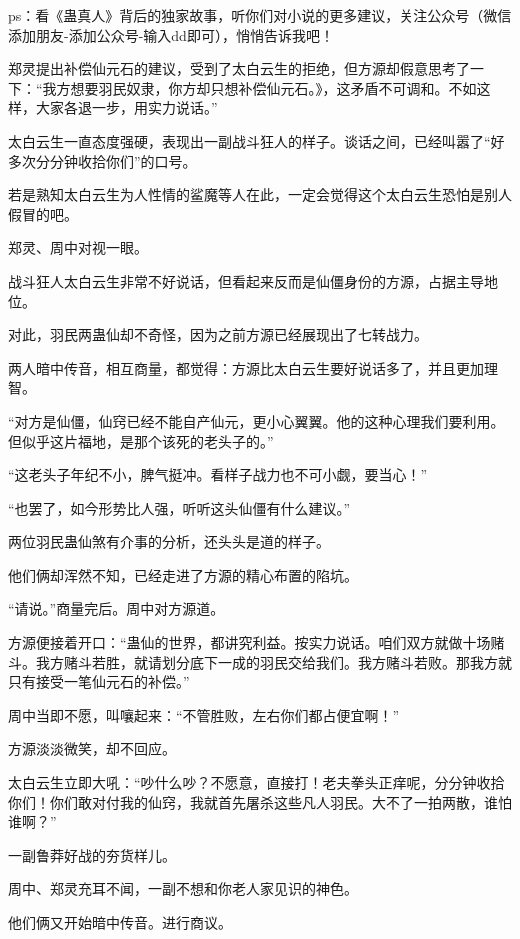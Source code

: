 
\begin{this_body}

ps：看《蛊真人》背后的独家故事，听你们对小说的更多建议，关注公众号（微信添加朋友-添加公众号-输入dd即可），悄悄告诉我吧！

郑灵提出补偿仙元石的建议，受到了太白云生的拒绝，但方源却假意思考了一下：“我方想要羽民奴隶，你方却只想补偿仙元石。》，这矛盾不可调和。不如这样，大家各退一步，用实力说话。”

太白云生一直态度强硬，表现出一副战斗狂人的样子。谈话之间，已经叫嚣了“好多次分分钟收拾你们”的口号。

若是熟知太白云生为人性情的鲨魔等人在此，一定会觉得这个太白云生恐怕是别人假冒的吧。

郑灵、周中对视一眼。

战斗狂人太白云生非常不好说话，但看起来反而是仙僵身份的方源，占据主导地位。

对此，羽民两蛊仙却不奇怪，因为之前方源已经展现出了七转战力。

两人暗中传音，相互商量，都觉得：方源比太白云生要好说话多了，并且更加理智。

“对方是仙僵，仙窍已经不能自产仙元，更小心翼翼。他的这种心理我们要利用。但似乎这片福地，是那个该死的老头子的。”

“这老头子年纪不小，脾气挺冲。看样子战力也不可小觑，要当心！”

“也罢了，如今形势比人强，听听这头仙僵有什么建议。”

两位羽民蛊仙煞有介事的分析，还头头是道的样子。

他们俩却浑然不知，已经走进了方源的精心布置的陷坑。

“请说。”商量完后。周中对方源道。

方源便接着开口：“蛊仙的世界，都讲究利益。按实力说话。咱们双方就做十场赌斗。我方赌斗若胜，就请划分底下一成的羽民交给我们。我方赌斗若败。那我方就只有接受一笔仙元石的补偿。”

周中当即不愿，叫嚷起来：“不管胜败，左右你们都占便宜啊！”

方源淡淡微笑，却不回应。

太白云生立即大吼：“吵什么吵？不愿意，直接打！老夫拳头正痒呢，分分钟收拾你们！你们敢对付我的仙窍，我就首先屠杀这些凡人羽民。大不了一拍两散，谁怕谁啊？”

一副鲁莽好战的夯货样儿。

周中、郑灵充耳不闻，一副不想和你老人家见识的神色。

他们俩又开始暗中传音。进行商议。


\end{this_body}
